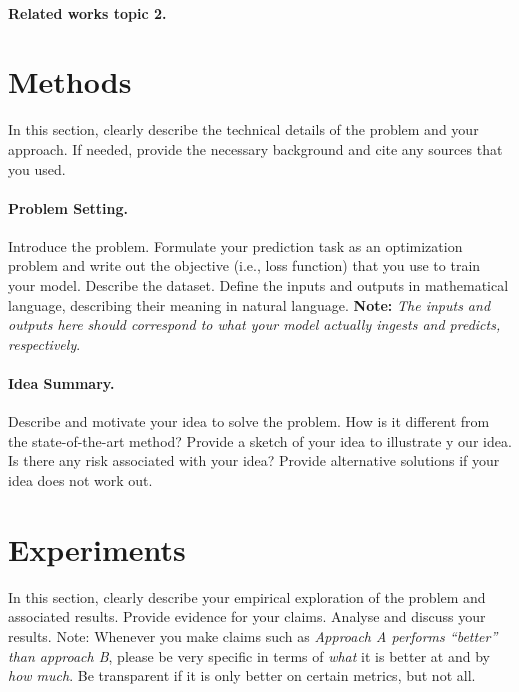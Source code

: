 \documentclass{article}
\begin{document}
\paragraph{Related works topic 2.}
% 

\section{Methods}
\label{sec:methods}
In this section, clearly describe the technical details of the problem and your approach. If needed, provide the necessary background and cite any sources that you used.


\paragraph{Problem Setting.}
Introduce the problem. Formulate your prediction task as an optimization problem and write out the objective (i.e., loss function) that you use to train your model. Describe the dataset. Define the inputs and outputs in mathematical language, describing their meaning in natural language. \textbf{Note:} \textit{The inputs and outputs here should correspond to what your model actually ingests and predicts, respectively}. 


\paragraph{Idea Summary.}
Describe and motivate your idea to solve the problem.  How is it different from the state-of-the-art method? Provide a sketch of your idea to illustrate y our idea. Is there any risk associated with your idea? Provide alternative solutions if your idea does not work out.





\section{Experiments}
\label{sec:experiments}
% 
In this section, clearly describe your empirical exploration of the problem and associated results. Provide evidence for your claims.
Analyse and discuss your results.
Note: Whenever you make claims such as \textit{Approach A performs ``better'' than approach B}, please be very specific in terms of \emph{what} it is better at and by \emph{how much}. Be transparent if it is only better on certain metrics, but not all.
\end{document}
